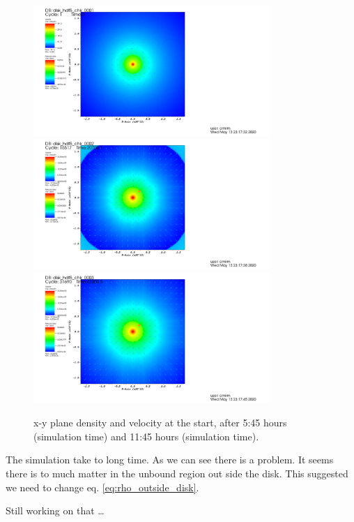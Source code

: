 \documentclass[12pt, a4paper]{article}
\begin{document}
\begin{figure}[ht!]
    \begin{center}
        \includegraphics[width=0.8\textwidth]{density-vel-x-y-0.png}
        \includegraphics[width=0.8\textwidth]{density-vel-x-y-5-75.png}
        \includegraphics[width=0.8\textwidth]{density-vel-x-y-11-75.png}
    \end{center}
    \caption{
        x-y plane density and velocity at the start, after 5:45 hours (simulation time) and 11:45 hours (simulation time).
    }\label{fig:dens-vel-xy-t5-t11}
\end{figure}

The simulation take to long time.
As we can see there is a problem.
It seems there is to much matter in the unbound region out side the disk.
This suggested we need to change eq. \ref{eq:rho_outside_disk}.

Still working on that \dots


\end{document}
